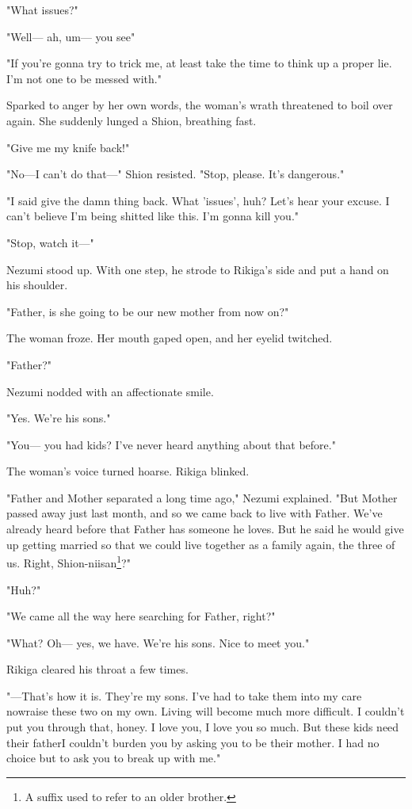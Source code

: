 "What issues?"

"Well--- ah, um--- you see\el "

"If you're gonna try to trick me, at least take the time to think up a
proper lie. I'm not one to be messed with."

Sparked to anger by her own words, the woman's wrath threatened to boil
over again. She suddenly lunged a Shion, breathing fast.

"Give me my knife back!"

"No---I can't do that---" Shion resisted. "Stop, please. It's dangerous."

"I said give the damn thing back. What 'issues', huh? Let's hear your
excuse. I can't believe I'm being shitted like this. I'm gonna kill
you."

"Stop, watch it---"

Nezumi stood up. With one step, he strode to Rikiga's side and put a
hand on his shoulder.

"Father, is she going to be our new mother from now on?"

The woman froze. Her mouth gaped open, and her eyelid twitched.

"Father?"

Nezumi nodded with an affectionate smile.

"Yes. We're his sons."

"You--- you had kids? I've never heard anything about that before."

The woman's voice turned hoarse. Rikiga blinked.

"Father and Mother separated a long time ago," Nezumi explained. "But
Mother passed away just last month, and so we came back to live with
Father. We've already heard before that Father has someone he loves. But
he said he would give up getting married so that we could live together
as a family again, the three of us. Right, Shion-niisan\footnote{A suffix used to refer to an older brother.}?"

"Huh?"

"We came all the way here searching for Father, right?"

"What? Oh--- yes, we have. We're his sons. Nice to meet you."

Rikiga cleared his throat a few times.

"---That's how it is. They're my sons. I've had to take them into my care
now\el raise these two on my own. Living will become much more
difficult. I couldn't put you through that, honey. I love you, I love
you so much. But these kids need their father\el I couldn't burden you
by asking you to be their mother. I had no choice but to ask you to
break up with me."

